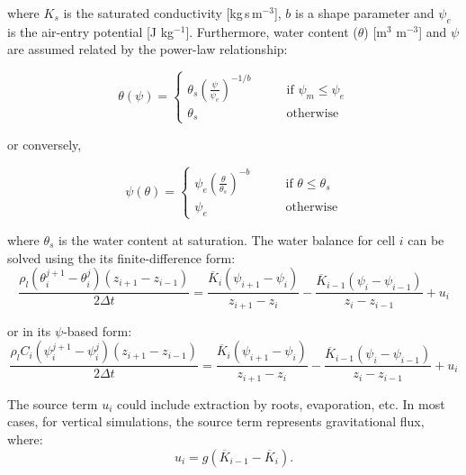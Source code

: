 \documentclass[10pt, letterpapr]{article}
\begin{document}
\noindent where $K_s$ is the saturated conductivity [kg\,s\,m$^{-3}$], $b$ is a shape parameter and $\psi_e$ is the air-entry potential [J kg$^{-1}$]. Furthermore, water content ($\theta$) [m$^3$ m$^{-3}$] and $\psi$ are assumed related by the power-law relationship:

\[
	\theta(\psi)=
	\begin{cases}
		\theta_s\left(\frac{\psi}{\psi_e}\right)^{-1/b}  \qquad &\text{if $\psi_m\leq\psi_e$} \\
		\theta_s  &\text{otherwise}
	\end{cases}
\]

\noindent or conversely,

\[
	\psi(\theta)=
	\begin{cases}
		\psi_e\left(\frac{\theta}{\theta_s}\right)^{-b}  \qquad &\text{if $\theta\leq\theta_s$} \\
		\psi_e  &\text{otherwise}
	\end{cases}
\]

\noindent where $\theta_s$ is the water content at saturation. The water balance for cell $i$ can be solved using the its finite-difference form: %
\[
	\frac{\rho_l\left(\theta_i^{j+1}-\theta_i^j\right)\left(z_{i+1}-z_{i-1}\right)}{2\Delta t}=\frac{\overline{K}_i\left(\psi_{i+1}-\psi_i\right)}{z_{i+1}-z_i}-\frac{\overline{K}_{i-1}\left(\psi_i-\psi_{i-1}\right)}{z_i-z_{i-1}}+u_i
\]

\noindent or in its $\psi$-based form:
\[
	\frac{\rho_lC_i\left(\psi_i^{j+1}-\psi_i^j\right)\left(z_{i+1}-z_{i-1}\right)}{2\Delta t}=\frac{\overline{K}_i\left(\psi_{i+1}-\psi_i\right)}{z_{i+1}-z_i}-\frac{\overline{K}_{i-1}\left(\psi_i-\psi_{i-1}\right)}{z_i-z_{i-1}}+u_i
\]

The source term $u_i$ could include extraction by roots, evaporation, etc. In most cases, for vertical simulations, the source term represents gravitational flux, where:
\[
	u_i=g\left(\overline{K}_{i-1}-\overline{K}_i\right).
\]

\end{document}
